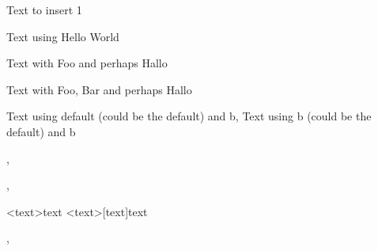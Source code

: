 \documentclass[12pt,ngerman,parskip=half]{scrartcl}
\newcommand\NoArgsO{Text to insert 1}
\newcommand\OneArgO[1]{Text using #1}
\newcommand\OneOptOfTwoO[2][]{Text with #2 and perhaps #1}
\newcommand\OneOptOfThreeO[3][]{Text with #2, #3 and perhaps #1}
\newcommand\OneOptWithDefaultO[2][default]%
  {Text using #1 (could be the default) and #2}
\begin{document}
\NoArgsO

\NoArgsN

\OneArgO{Hello World}


\OneOptOfTwoO[Hallo]{Foo}

\OneOptOfThreeO[Hallo]{Foo}{Bar}





\OneOptWithDefaultO{b}, \OneOptWithDefaultO[b]{b}

, 


, 



\TwoTypesOfOptN<text>{text}       %
\TwoTypesOfOptN<text>[text]{text} %

, 
\end{document}
